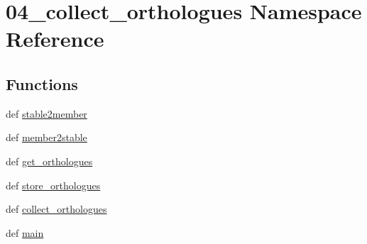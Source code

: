 \hypertarget{namespace04__collect__orthologues}{\section{04\-\_\-collect\-\_\-orthologues Namespace Reference}
\label{namespace04__collect__orthologues}
}
\subsection*{Functions}
\begin{DoxyCompactItemize}
\item 
def \hyperlink{namespace04__collect__orthologues_a93e9c84b01bac524f55896035dedd884}{stable2member}
\item 
def \hyperlink{namespace04__collect__orthologues_aaba086552a7e47b89cfcd7950cf1ff90}{member2stable}
\item 
def \hyperlink{namespace04__collect__orthologues_a1d0e5ad0d2ff7a9457b20a4a98d48aa3}{get\-\_\-orthologues}
\item 
def \hyperlink{namespace04__collect__orthologues_ac24e9c3c5b23e9e129724257b00154c3}{store\-\_\-orthologues}
\item 
def \hyperlink{namespace04__collect__orthologues_a1919d07d916e6396b42b0dd0dd4a1a90}{collect\-\_\-orthologues}
\item 
def \hyperlink{namespace04__collect__orthologues_a54a5b8cf682392ba3167c17bb9389c01}{main}
\end{DoxyCompactItemize}



